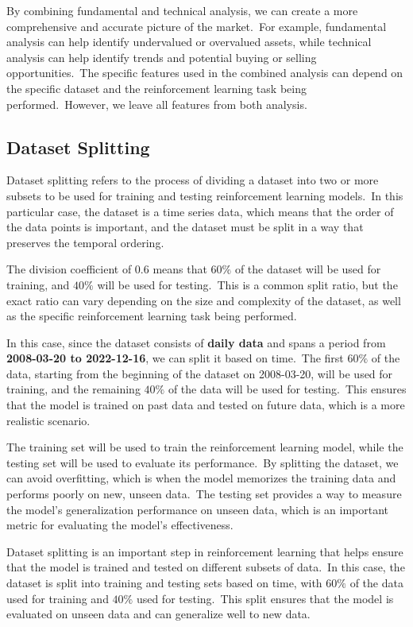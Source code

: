 \documentclass[../xlapes02]{subfiles}
\begin{document}
    By combining fundamental and technical analysis, we can create a more comprehensive and accurate picture of the market.\ For example, fundamental analysis can help identify undervalued or overvalued assets, while technical analysis can help identify trends and potential buying or selling opportunities.\ The specific features used in the combined analysis can depend on the specific dataset and the reinforcement learning task being performed.\ However, we leave all features from both analysis.

    \subsection{Dataset Splitting}\label{subsec:dataset-splitting}
    Dataset splitting refers to the process of dividing a dataset into two or more subsets to be used for training and testing reinforcement learning models.\ In this particular case, the dataset is a time series data, which means that the order of the data points is important, and the dataset must be split in a way that preserves the temporal ordering.

    The division coefficient of $0.6$ means that $60\%$ of the dataset will be used for training, and $40\%$ will be used for testing.\ This is a common split ratio, but the exact ratio can vary depending on the size and complexity of the dataset, as well as the specific reinforcement learning task being performed.

    In this case, since the dataset consists of \textbf{daily data} and spans a period from \textbf{2008-03-20 to 2022-12-16}, we can split it based on time.\ The first $60\%$ of the data, starting from the beginning of the dataset on 2008-03-20, will be used for training, and the remaining $40\%$ of the data will be used for testing.\ This ensures that the model is trained on past data and tested on future data, which is a more realistic scenario.

    The training set will be used to train the reinforcement learning model, while the testing set will be used to evaluate its performance.\ By splitting the dataset, we can avoid overfitting, which is when the model memorizes the training data and performs poorly on new, unseen data.\ The testing set provides a way to measure the model's generalization performance on unseen data, which is an important metric for evaluating the model's effectiveness.

    Dataset splitting is an important step in reinforcement learning that helps ensure that the model is trained and tested on different subsets of data.\ In this case, the dataset is split into training and testing sets based on time, with $60\%$ of the data used for training and $40\%$ used for testing.\ This split ensures that the model is evaluated on unseen data and can generalize well to new data.
\end{document}
